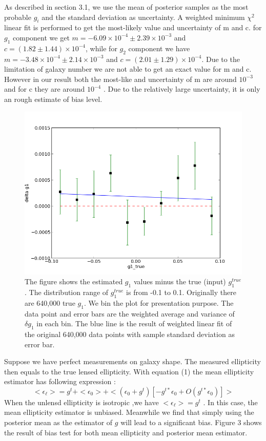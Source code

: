 \documentclass[useAMS,usenatbib]{mn2e}
\begin{document}
As described in section 3.1, we use the mean of posterior samples as the most probable $g_{i}$ and 
the standard deviation as uncertainty. A weighted minimum $\chi^{2}$ linear fit is performed to get the
most-likely value and uncertainty of m and c. for $g_{1}$ component we get $m=-6.09\times10^{-4}\pm2.39\times10^{-3}$
and $c=(1.82\pm1.44)\times10^{-4}$, while for $g_{2}$ component
we have $m=-3.48\times10^{-4}\pm2.14\times10^{-3}$ and $c=(2.01\pm1.29)\times10^{-4}$.
Due to the limitation of galaxy number we are not able to get an exact value for m and c. However in our result 
both the most-like and uncertainty of m are around $10^{-3}$ and for c they are around $10^{-4}$ . Due to the
relatively large uncertainty, it is only an rough estimate of bias level.
\begin{figure}
\includegraphics[scale=0.5]{fig/g1bias}

\caption{The figure shows the estimated $g_{1}$ values minus the true (input)
$g_{1}^{true}$. The distribution range of $g_{1}^{true}$ is from
-0.1 to 0.1. Originally there are 640,000 true $g_{1}$. We bin the
plot for presentation purpose. The data point and error bars are the weighted
 average and  variance of $\delta g_{1}$ in each bin. The blue
line is the result of weighted linear fit of the original 640,000 data points
with sample standard deviation as error bar.}
\end{figure}
Suppose we have perfect measurements on galaxy shape. The measured ellipticity then equals to the true lensed ellipticity. With equation (1) the mean ellipticity
estimator has following expression :
\begin{equation}
<\epsilon_{\ell}>=g^{t}+<\epsilon_{0}>+<(\epsilon_{0}+g^{t})[-g^{t*}\epsilon_{0}+O(g^{t*}\epsilon_{0})]>
\end{equation}
When the unlensd ellipticity is isotropic ,we have $<\epsilon_{\ell}>=g^{t}$ . In this case, the mean ellipticity estimator is 
unbiased.
Meanwhile we find that simply using the posterior mean as the estimator of $g$ will lead to a significant bias. 
Figure 3 shows the result of bias test for both mean ellipticity and posterior mean estimator.
\end{document}

